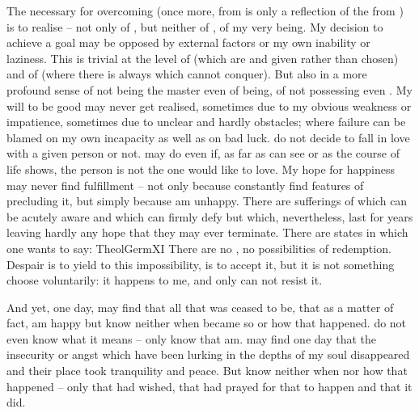 \pa The  necessary for overcoming  (once more,
 from  is only a reflection of the 
from ) is to realise  -- not only of , but neither of , of my very being.  My decision to achieve
a goal may be opposed by external factors or my own inability or laziness.  This
is trivial at the level of  (which are  and given
rather than chosen) and of  (where there is always  which
 cannot conquer).  But  also in a more profound sense
of not being the master even of  being, of not possessing even
.  My will to be good may never get realised, sometimes due to my
obvious weakness or impatience, sometimes due to unclear and hardly 
obstacles; where failure can be blamed on my own incapacity as well as on bad
luck.   do not decide to fall in love with a given person or not.   may do
even if, as far as  can see or as the course of life shows, the person is not
the one  would like to love.  My hope for happiness may never find fulfillment
-- not only because  constantly find features of  precluding it, but
simply because  am unhappy.  There are sufferings of which  can be acutely
aware and which  can firmly defy but which, nevertheless, last for years
leaving hardly any hope that they may ever terminate.  There are states in which
one wants to say: \citet{Let me perish, let me die!  I live without hope; from
  within and from without I am condemned, let no one pray that I may be
  released!}{TheolGerm}{XI} There are no , no 
possibilities of redemption.  Despair is to yield to this impossibility, is to
accept it, but it is not something  choose voluntarily: it happens to me,
and  only can not resist it.

And yet, one day,  may find that all that was ceased to be, that
as a matter of fact,  am happy but  know
neither when  became so or how that happened.   do not even know what it means
--  only know that  am.   may find one day that the insecurity or angst which
have been lurking in the depths of my soul disappeared and their place took
tranquility and peace.  But  know neither when nor how that happened -- only
that  had wished, that  had prayed for that to happen and that it did.

